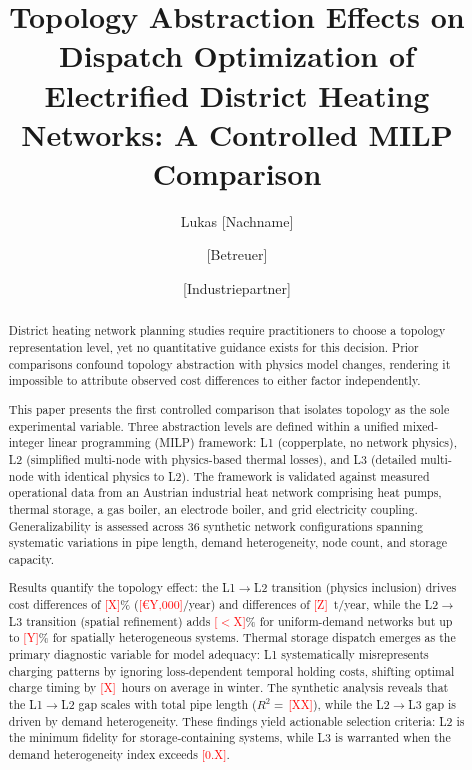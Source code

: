 \documentclass[review,3p]{elsarticle}
\newcommand{\placeholder}[1]{\textcolor{red}{[#1]}}
\begin{document}
\begin{frontmatter}

\title{Topology Abstraction Effects on Dispatch Optimization of
Electrified District Heating Networks: A Controlled MILP Comparison}

\author[tum]{Lukas [Nachname]}
\author[tum]{[Betreuer]}
\author[partner]{[Industriepartner]}


\address[tum]{Lehrstuhl für Energiewirtschaft und Anwendungstechnik,
  Technische Universität München, München, Germany}

\address[partner]{[Industriepartner Institution], [Stadt], Austria}

\begin{abstract}
District heating network planning studies require practitioners to choose
a topology representation level, yet no quantitative guidance exists for
this decision. Prior comparisons confound topology abstraction with
physics model changes, rendering it impossible to attribute observed
cost differences to either factor independently.

This paper presents the first controlled comparison that isolates
topology as the sole experimental variable. Three abstraction levels
are defined within a unified mixed-integer linear programming (MILP)
framework: L1 (copperplate, no network physics), L2 (simplified
multi-node with physics-based thermal losses), and L3 (detailed
multi-node with identical physics to L2). The framework is validated
against measured operational data from an Austrian industrial heat
network comprising heat pumps, thermal storage, a gas boiler, an
electrode boiler, and grid electricity coupling. Generalizability is
assessed across 36 synthetic network configurations spanning systematic
variations in pipe length, demand heterogeneity, node count, and
storage capacity.

Results quantify the topology effect: the L1$\rightarrow$L2 transition
(physics inclusion) drives cost differences of \placeholder{X}\%
(\placeholder{€Y,000}/year) and  differences of
\placeholder{Z}~t/year, while the L2$\rightarrow$L3 transition
(spatial refinement) adds \placeholder{$<$X}\% for uniform-demand
networks but up to \placeholder{Y}\% for spatially heterogeneous
systems. Thermal storage dispatch emerges as the primary diagnostic
variable for model adequacy: L1 systematically misrepresents charging
patterns by ignoring loss-dependent temporal holding costs, shifting
optimal charge timing by \placeholder{X}~hours on average in winter.
The synthetic analysis reveals that the L1$\rightarrow$L2 gap scales
with total pipe length ($R^2\!=\,$\placeholder{XX}), while the
L2$\rightarrow$L3 gap is driven by demand heterogeneity. These
findings yield actionable selection criteria: L2 is the minimum
fidelity for storage-containing systems, while L3 is warranted when
the demand heterogeneity index exceeds \placeholder{0.X}.
\end{abstract}


\end{frontmatter}
\end{document}
